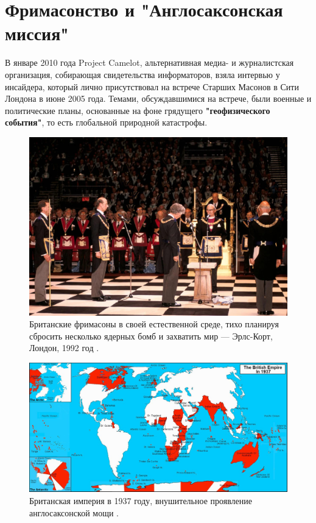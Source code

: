 \documentclass[10pt,twocolumn,letterpaper]{article}
\begin{document}
\section{Фримасонство и "Англосаксонская миссия"}

В январе 2010 года Project Camelot, альтернативная медиа- и журналистская организация, собирающая свидетельства информаторов, взяла интервью \cite{4,6} у инсайдера, который лично присутствовал на встрече Старших Масонов в Сити Лондона в июне 2005 года. Темами, обсуждавшимися на встрече, были военные и политические планы, основанные на фоне грядущего \textbf{"геофизического события"}, то есть глобальной природной катастрофы.

\begin{figure}[b]
\begin{center}
   \includegraphics[width=1\linewidth]{freemason.jpg}
\end{center}
   \caption{Британские фримасоны в своей естественной среде, тихо планируя сбросить несколько ядерных бомб и захватить мир — Эрлс-Корт, Лондон, 1992 год \cite{5}.}
\label{fig:1}
\label{fig:onecol}
\end{figure}

\begin{figure}[t]
\begin{center}
\includegraphics[width=1\textwidth]{british.jpg}
\end{center}
   \caption{Британская империя в 1937 году, внушительное проявление англосаксонской мощи \cite{14}.}
   \label{fig:2}
\end{figure}
\end{document}
